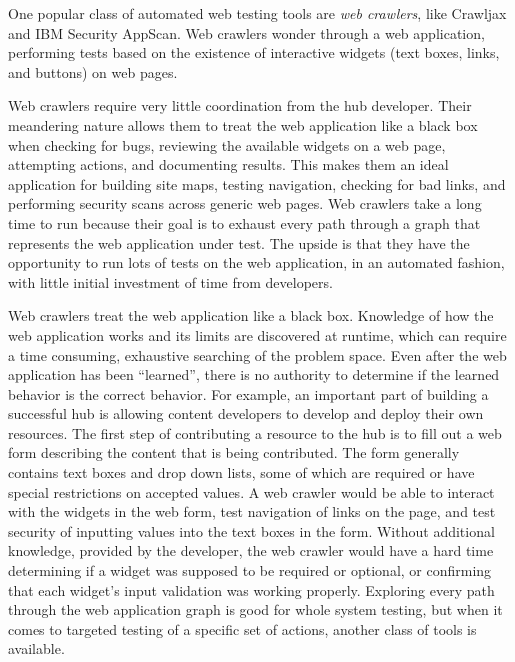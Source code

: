 \documentclass[letterpaper]{scrartcl}
\begin{document}
One popular class of automated web testing tools are \textit{web crawlers},
like Crawljax and IBM Security AppScan. Web crawlers wonder through a web
application, performing tests based on the existence of interactive widgets
(text boxes, links, and buttons) on web pages.


Web crawlers require very little coordination from the hub developer. Their
meandering nature allows them to treat the web application like a black box
when checking for bugs, reviewing the available widgets on a web page,
attempting actions, and documenting results. This makes them an ideal
application for building site maps, testing navigation, checking for bad links,
and performing security scans across generic web pages. Web crawlers take a
long time to run because their goal is to exhaust every path through a graph
that represents the web application under test.  The upside is that they have
the opportunity to run lots of tests on the web application, in an automated
fashion, with little initial investment of time from developers.

Web crawlers treat the web application like a black box. Knowledge of how the
web application works and its limits are discovered at runtime, which can
require a time consuming, exhaustive searching of the problem space. Even after
the web application has been ``learned'', there is no authority to determine if
the learned behavior is the correct behavior. For example, an important part of
building a successful hub is allowing content developers to develop and deploy
their own resources.  The first step of contributing a resource to the hub is to
fill out a web form describing the content that is being contributed. The
form generally contains text boxes and drop down lists, some of which are
required or have special restrictions on accepted values. A web crawler would
be able to interact with the widgets in the web form, test navigation of links
on the page, and test security of inputting values into the text boxes in the
form.  Without additional knowledge, provided by the developer, the web crawler
would have a hard time determining if a widget was supposed to be required or
optional, or confirming that each widget's input validation was working
properly.
%
%
%
Exploring every path through the web application graph is good for whole system
testing, but when it comes to targeted testing of a specific set of actions,
another class of tools is available.
\end{document}
